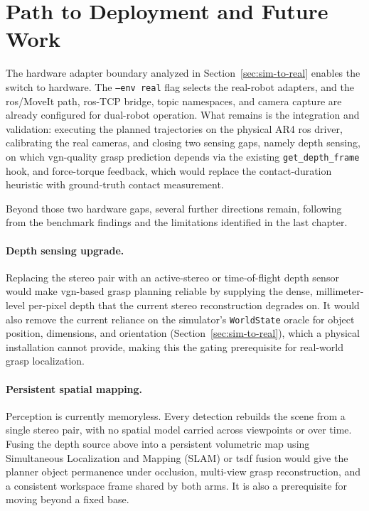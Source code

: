\section{Path to Deployment and Future Work}
The hardware adapter boundary analyzed in Section~\ref{sec:sim-to-real} enables the switch to hardware. The \texttt{--env real} flag selects the real-robot adapters, and the \gls{ros}/MoveIt path, \gls{ros}-TCP bridge, topic namespaces, and camera capture are already configured for dual-robot operation. What remains is the integration and validation: executing the planned trajectories on the physical AR4 \gls{ros} driver, calibrating the real cameras, and closing two sensing gaps, namely depth sensing, on which \gls{vgn}-quality grasp prediction depends via the existing \texttt{get\_depth\_frame} hook, and force-torque feedback, which would replace the contact-duration heuristic with ground-truth contact measurement.

Beyond those two hardware gaps, several further directions remain, following from the benchmark findings and the limitations identified in the last chapter.

\paragraph{Depth sensing upgrade.} Replacing the stereo pair with an active-stereo or time-of-flight depth sensor would make \gls{vgn}-based grasp planning reliable by supplying the dense, millimeter-level per-pixel depth that the current stereo reconstruction degrades on. It would also remove the current reliance on the simulator's \texttt{WorldState} oracle for object position, dimensions, and orientation (Section~\ref{sec:sim-to-real}), which a physical installation cannot provide, making this the gating prerequisite for real-world grasp localization.

\paragraph{Persistent spatial mapping.} Perception is currently memoryless. Every detection rebuilds the scene from a single stereo pair, with no spatial model carried across viewpoints or over time. Fusing the depth source above into a persistent volumetric map using Simultaneous Localization and Mapping (SLAM) or \gls{tsdf} fusion would give the planner object permanence under occlusion, multi-view grasp reconstruction, and a consistent workspace frame shared by both arms. It is also a prerequisite for moving beyond a fixed base.

